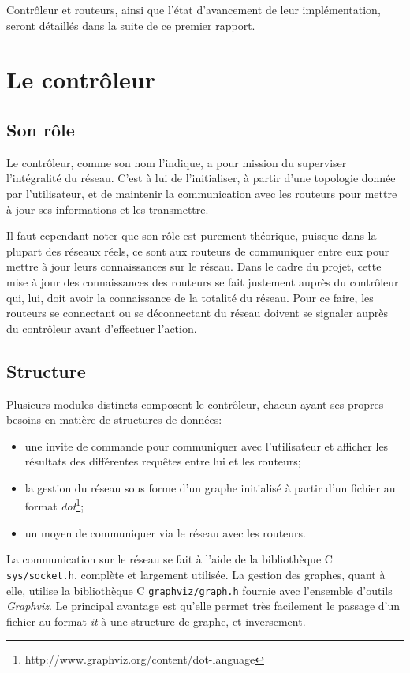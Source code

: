 \documentclass[a4paper,11pt]{article}
\begin{document}
Contrôleur et routeurs, ainsi que l'état d'avancement de leur implémentation, seront détaillés dans la suite de ce premier rapport.

\section{Le contrôleur}

\subsection{Son rôle}

Le contrôleur, comme son nom l'indique, a pour mission du superviser l'intégralité du réseau. C'est à lui de l'initialiser, à partir d'une topologie donnée par l'utilisateur, et de maintenir la communication avec les routeurs pour mettre à jour ses informations et les transmettre.

Il faut cependant noter que son rôle est purement théorique, puisque dans la plupart des réseaux réels, ce sont aux routeurs de communiquer entre eux pour mettre à jour leurs connaissances sur le réseau. Dans le cadre du projet, cette mise à jour des connaissances des routeurs se fait justement auprès du contrôleur qui, lui, doit avoir la connaissance de la totalité du réseau. Pour ce faire, les routeurs se connectant ou se déconnectant du réseau doivent se signaler auprès du contrôleur avant d'effectuer l'action.

\subsection{Structure}

Plusieurs modules distincts composent le contrôleur, chacun ayant ses propres besoins en matière de structures de données:
\begin{itemize}
\item une invite de commande pour communiquer avec l'utilisateur et afficher les résultats des différentes requêtes entre lui et les routeurs;
\item la gestion du réseau sous forme d'un graphe initialisé à partir d'un fichier au format \textit{dot}\footnote{http://www.graphviz.org/content/dot-language};
\item un moyen de communiquer via le réseau avec les routeurs.
\end{itemize}

La communication sur le réseau se fait à l'aide de la bibliothèque C \texttt{sys/socket.h}, complète et largement utilisée. La gestion des graphes, quant à elle, utilise la bibliothèque C \texttt{graphviz/graph.h} fournie avec l'ensemble d'outils \textit{Graphviz}. Le principal avantage est qu'elle permet très facilement le passage d'un fichier au format \textit{it} à une structure de graphe, et inversement.
\end{document}
